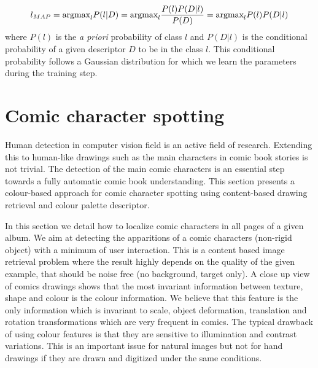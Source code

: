 \begin{equation}\label{eq:be:fine_class}
  l_{MAP} \\
  = \mbox{argmax}_{l} P(l|D) \\
  = \mbox{argmax}_{l} \frac{P(l) P(D | l)}{P(D)}\\
  = \mbox{argmax}_{l} P(l) P(D | l)
\end{equation}
where $P(l)$ is the \textit{a priori} probability of class $l$ and $P(D|l)$ is the conditional probability of a given descriptor $D$ to be in the class $l$. This conditional probability follows a Gaussian distribution for which we learn the parameters during the training step.






\section{Comic character spotting}
\label{sec:in:character_spotting}
Human detection in computer vision field is an active field of research. Extending this to human-like drawings such as the main characters in comic book stories is not trivial.
The detection of the main comic characters is an essential step towards a fully automatic comic book understanding.
This section presents a colour-based approach for comic character spotting using content-based drawing retrieval and colour palette descriptor.

In this section we detail how to localize comic characters in all pages of a given album.
We aim at detecting the apparitions of a comic characters (non-rigid object) with a minimum of user interaction. This is a content based image retrieval problem where the result highly depends on the quality of the given example, that should be noise free (no background, target only). 
A close up view of comics drawings shows that the most invariant information between texture, shape and colour is the colour information. We believe that this feature is the only information which is invariant to scale, object deformation, translation and rotation transformations which are very frequent in comics. The typical drawback of using colour features is that they are sensitive to illumination and contrast variations. This is an important issue for natural images but not for hand drawings if they are drawn and digitized under the same conditions. 

